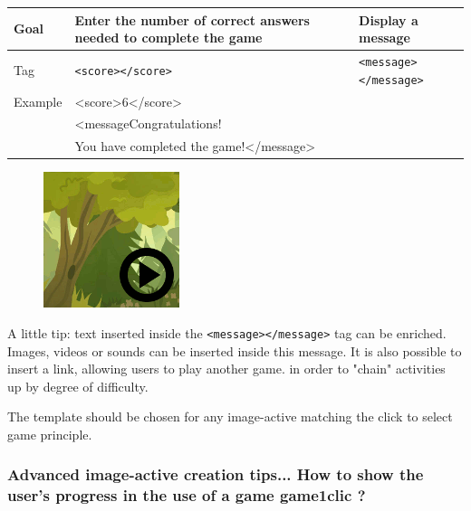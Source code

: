 \begin{center}
 \begin{tabular}{|l|p{2in}|p{2in}|}
 \hline
  Goal & Enter the number of correct answers needed to complete the game & Display a message\\
  \hline
  Tag & \verb|<score></score>| & \verb|<message></message>|\\
  \hline
  Example & \multicolumn{2}{|l|}{<score>6</score>}\\
   & \multicolumn{2}{|l|}{<messageCongratulations!}\\
    & \multicolumn{2}{|l|}{You have completed the game!</message>}\\
  \hline
 \end{tabular}
\end{center}

\begin{figure}
  \centering
  \includegraphics[scale=0.7]{./images/game1clic} 
\end{figure}

A little tip: text inserted inside the \verb|<message></message>| tag can be 
enriched. Images, videos or sounds can be inserted inside this message.
It is also possible to insert a link, allowing users to play another game.
in order to "chain" activities up by degree of difficulty.

The template  should be chosen for any image-active matching 
the click to select game principle.



\subsubsection{Advanced image-active creation tips... How to show the user's progress in the use of a game game1clic ?}

